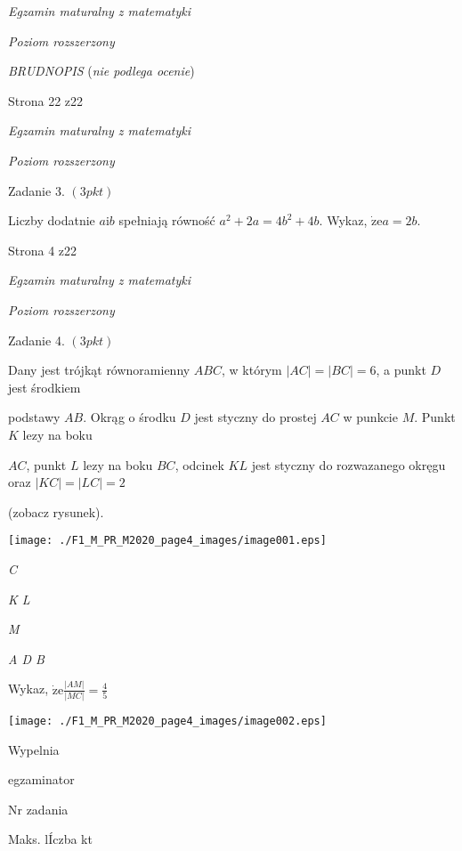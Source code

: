 \documentclass[a4paper,12pt]{article}
\begin{document}
{\it Egzamin maturalny z matematyki}

{\it Poziom rozszerzony}

{\it BRUDNOPIS} ({\it nie podlega ocenie})

Strona 22 z22















{\it Egzamin maturalny z matematyki}

{\it Poziom rozszerzony}

Zadanie 3. $(3pkt)$

Liczby dodatnie $a\mathrm{i}b$ spełniają równość $a^{2}+2a=4b^{2}+4b$. Wykaz, $\dot{\mathrm{z}}\mathrm{e}a=2b.$

Strona 4 z22





{\it Egzamin maturalny z matematyki}

{\it Poziom rozszerzony}

Zadanie 4. $(3pkt)$

Dany jest trójkąt równoramienny $ABC$, w którym $|AC|=|BC|=6$, a punkt $D$ jest środkiem

podstawy $AB$. Okrąg o środku $D$ jest styczny do prostej $AC$ w punkcie $M$. Punkt $K$ lezy na boku

$AC$, punkt $L$ lezy na boku $BC$, odcinek $KL$ jest styczny do rozwazanego okręgu oraz $|KC|=|LC|=2$

(zobacz rysunek).
\begin{center}
\texttt{[image: ./F1\_M\_PR\_M2020\_page4\_images/image001.eps]}
\end{center}
{\it C}

{\it K  L}

{\it M}

{\it A  D  B}

Wykaz, $\displaystyle \dot{\mathrm{z}}\mathrm{e}\frac{|AM|}{|MC|}=\frac{4}{5}$
\begin{center}
\texttt{[image: ./F1\_M\_PR\_M2020\_page4\_images/image002.eps]}
\end{center}
Wypelnia

egzaminator

Nr zadania

Maks. lÍczba kt
\end{document}
